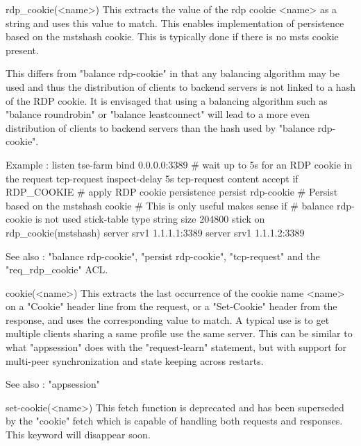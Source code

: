   rdp_cookie(<name>)
               This extracts the value of the rdp cookie <name> as a string
               and uses this value to match. This enables implementation of
               persistence based on the mstshash cookie. This is typically
               done if there is no msts cookie present.

               This differs from "balance rdp-cookie" in that any balancing
               algorithm may be used and thus the distribution of clients
               to backend servers is not linked to a hash of the RDP
               cookie. It is envisaged that using a balancing algorithm
               such as "balance roundrobin" or "balance leastconnect" will
               lead to a more even distribution of clients to backend
               servers than the hash used by "balance rdp-cookie".

               Example :
                listen tse-farm
                    bind 0.0.0.0:3389
                    # wait up to 5s for an RDP cookie in the request
                    tcp-request inspect-delay 5s
                    tcp-request content accept if RDP_COOKIE
                    # apply RDP cookie persistence
                    persist rdp-cookie
                    # Persist based on the mstshash cookie
                    # This is only useful makes sense if
                    # balance rdp-cookie is not used
                    stick-table type string size 204800
                    stick on rdp_cookie(mstshash)
                    server srv1 1.1.1.1:3389
                    server srv1 1.1.1.2:3389

               See also : "balance rdp-cookie", "persist rdp-cookie",
               "tcp-request" and the "req_rdp_cookie" ACL.

  cookie(<name>)
               This extracts the last occurrence of the cookie name <name> on a
               "Cookie" header line from the request, or a "Set-Cookie" header
               from the response, and uses the corresponding value to match. A
               typical use is to get multiple clients sharing a same profile
               use the same server. This can be similar to what "appsession"
               does with the "request-learn" statement, but with support for
               multi-peer synchronization and state keeping across restarts.

               See also : "appsession"

  set-cookie(<name>)
               This fetch function is deprecated and has been superseded by the
               "cookie" fetch which is capable of handling both requests and
               responses. This keyword will disappear soon.

